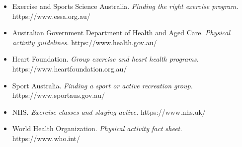 \begin{itemize}
    \item Exercise and Sports Science Australia. \textit{Finding the right exercise program.} https://www.essa.org.au/
    \item Australian Government Department of Health and Aged Care. \textit{Physical activity guidelines.} https://www.health.gov.au/
    \item Heart Foundation. \textit{Group exercise and heart health programs.} https://www.heartfoundation.org.au/
    \item Sport Australia. \textit{Finding a sport or active recreation group.} https://www.sportaus.gov.au/
    \item NHS. \textit{Exercise classes and staying active.} https://www.nhs.uk/
    \item World Health Organization. \textit{Physical activity fact sheet.} https://www.who.int/
\end{itemize}
